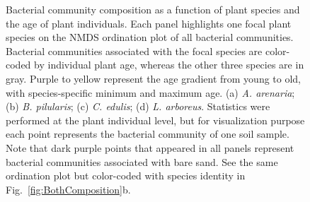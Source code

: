 \newpage
\begin{figure}[h]
	\centering
	\caption[Bacterial community composition as a function of plant species and the age of plant individuals.]
		{\hspace{1mm} 
		Bacterial community composition as a function of plant species and the age of plant individuals. Each panel highlights one focal plant species on the NMDS ordination plot of all bacterial communities. Bacterial communities associated with the focal species are color-coded by individual plant age, whereas the other three species are in gray. Purple to yellow represent the age gradient from young to old, with species-specific minimum and maximum age. (a) \textit{A. arenaria}; (b) \textit{B. pilularis}; (c) \textit{C. edulis}; (d) \textit{L. arboreus}. 
		Statistics were performed at the plant individual level, but for visualization purpose each point represents the bacterial community of one soil sample. Note that dark purple points that appeared in all panels represent bacterial communities associated with bare sand. See the same ordination plot but color-coded with species identity in Fig.~\ref{fig:BothComposition}b.}
	\label{fig:BacComposition}
\end{figure}



